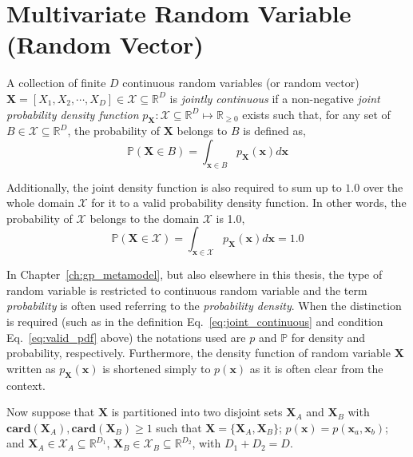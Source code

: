 \section{Multivariate Random Variable (Random Vector)}\label{app:probability}

A collection of finite $D$ continuous random variables (or random vector) $\mathbf{X} = [X_1, X_2, \cdots, X_D] \in \mathcal{X} \subseteq \mathbb{R}^D$ is \emph{jointly continuous} if a non-negative \emph{joint probability density function} $p_{\mathbf{X}}: \mathcal{X} \subseteq \mathbb{R}^D \mapsto \mathbb{R}_{\geq 0}$ exists such that, for any set of $B \in \mathcal{X} \subseteq \mathbb{R}^D$, the probability of $\mathbf{X}$ belongs to $B$ is defined as,
\begin{equation}
  \mathbb{P} (\mathbf{X} \in B) = \int_{\mathbf{x} \in B} p_{\mathbf{X}} (\mathbf{x}) d\mathbf{x}
\label{eq:joint_continuous}
\end{equation}

Additionally, the joint density function is also required to sum up to $1.0$ over the whole domain $\mathcal{X}$ for it to a valid probability density function.
In other words, the probability of $\mathcal{X}$ belongs to the domain $\mathcal{X}$ is 1.0,
\begin{equation}
  \mathbb{P} (\mathbf{X} \in \mathcal{X}) = \int_{\mathbf{x} \in \mathcal{X}} p_{\mathbf{X}} (\mathbf{x}) d\mathbf{x} = 1.0
\label{eq:valid_pdf}
\end{equation}

In Chapter~\ref{ch:gp_metamodel}, but also elsewhere in this thesis, the type of random variable is restricted to continuous random variable and the term \emph{probability} is often used referring to the \emph{probability density}.
When the distinction is required (such as in the definition Eq.~\ref{eq:joint_continuous} and condition Eq.~\ref{eq:valid_pdf} above) the notations used are $p$ and $\mathbb{P}$ for density and probability, respectively.
Furthermore, the density function of random variable $\mathbf{X}$ written as $p_\mathbf{X} (\mathbf{x})$ is shortened simply to $p (\mathbf{x})$ as it is often clear from the context.

Now suppose that $\mathbf{X}$ is partitioned into two disjoint sets $\mathbf{X}_A$ and $\mathbf{X}_B$ with $\mathbf{card}(\mathbf{X}_A), \mathbf{card}(\mathbf{X}_B) \geq 1$ 
such that $\mathbf{X}=\{\mathbf{X}_A,\mathbf{X}_B\}$; 
$p(\mathbf{x}) = p(\mathbf{x}_a,\mathbf{x}_b)$; 
and $\mathbf{X}_A \in \mathcal{X}_A \subseteq \mathbb{R}^{D_1}$, $\mathbf{X}_B \in \mathcal{X}_B \subseteq \mathbb{R}^{D_2}$, with $D_1 + D_2 = D$.
  
